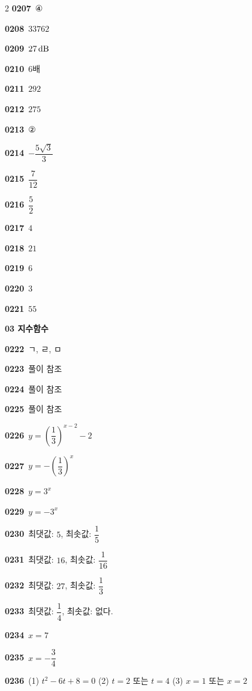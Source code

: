 \documentclass[10pt,a4paper]{article}
\begin{document}
\begin{multicols}{2}
\noindent\textbf{0207}\ ④\par
\noindent\textbf{0208}\ $33762$\par
\noindent\textbf{0209}\ $27\mkern3mu \mathrm{dB}$\par
\noindent\textbf{0210}\ $6$배\par
\noindent\textbf{0211}\ $292$\par
\noindent\textbf{0212}\ $275$\par
\noindent\textbf{0213}\ ②\par
\noindent\textbf{0214}\ $-\dfrac{5\sqrt{3}}{3}$\par
\noindent\textbf{0215}\ $\dfrac{7}{12}$\par
\noindent\textbf{0216}\ $\dfrac{5}{2}$\par
\noindent\textbf{0217}\ $4$\par
\noindent\textbf{0218}\ $21$\par
\noindent\textbf{0219}\ $6$\par
\noindent\textbf{0220}\ $3$\par
\noindent\textbf{0221}\ $55$\par
\noindent\textbf{03 지수함수}\par\smallskip
\noindent\textbf{0222}\ ㄱ, ㄹ, ㅁ\par
\noindent\textbf{0223}\ 풀이 참조\par
\noindent\textbf{0224}\ 풀이 참조\par
\noindent\textbf{0225}\ 풀이 참조\par
\noindent\textbf{0226}\ $y=\left(\dfrac{1}{3}\right)^{x-2}-2$\par
\noindent\textbf{0227}\ $y=-\left(\dfrac{1}{3}\right)^{x}$\par
\noindent\textbf{0228}\ $y=3^x$\par
\noindent\textbf{0229}\ $y=-3^x$\par
\noindent\textbf{0230}\ 최댓값: $5$, 최솟값: $\dfrac{1}{5}$\par
\noindent\textbf{0231}\ 최댓값: $16$, 최솟값: $\dfrac{1}{16}$\par
\noindent\textbf{0232}\ 최댓값: $27$, 최솟값: $\dfrac{1}{3}$\par
\noindent\textbf{0233}\ 최댓값: $\dfrac{1}{4}$, 최솟값: 없다.\par
\noindent\textbf{0234}\ $x=7$\par
\noindent\textbf{0235}\ $x=-\dfrac{3}{4}$\par
\noindent\textbf{0236}\ (1) $t^2-6t+8=0$ (2) $t=2$ 또는 $t=4$ (3) $x=1$ 또는 $x=2$\par

\end{multicols}
\end{document}
